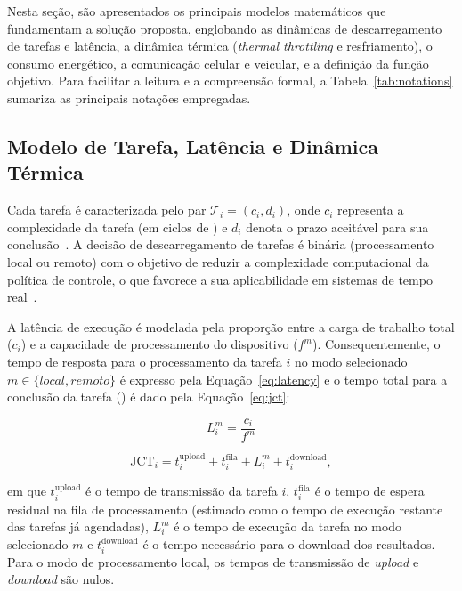 Nesta seção, são apresentados os principais modelos matemáticos que fundamentam a solução proposta, englobando as dinâmicas de descarregamento de tarefas e latência, a dinâmica térmica (\textit{thermal throttling} e resfriamento), o consumo energético, a comunicação celular e veicular, e a definição da função objetivo. Para facilitar a leitura e a compreensão formal, a Tabela~\ref{tab:notations} sumariza as principais notações empregadas.

\subsection{Modelo de Tarefa, Latência e Dinâmica Térmica}

Cada tarefa é caracterizada pelo par $\mathcal{T}_i=(c_i, d_i)$, onde $c_i$ representa a complexidade da tarefa (em ciclos de ) e $d_i$ denota o prazo aceitável para sua conclusão~\cite{liu2019, uddin2025, guo2024deep, cao2024survey}. A decisão de descarregamento de tarefas é binária (processamento local ou remoto) com o objetivo de reduzir a complexidade computacional da política de controle, o que favorece a sua aplicabilidade em sistemas de tempo real~\cite{liu2019, fofana2024}.

A latência de execução é modelada pela proporção entre a carga de trabalho total ($c_i$) e a capacidade de processamento do dispositivo ($f^m$). Consequentemente, o tempo de resposta para o processamento da tarefa $i$ no modo selecionado $m \in \{local, remoto\}$ é expresso pela Equação~\ref{eq:latency} e o tempo total para a conclusão da tarefa () é dado pela Equação~\ref{eq:jct}:

\begin{equation}
\label{eq:latency}
L_i^m = \frac{c_i}{f^m}
\end{equation}

\begin{equation}
\mathrm{JCT}_i = t_i^{\mathrm{upload}} + t_i^{\mathrm{fila}} + L_i^m + t_i^{\mathrm{download}},
\label{eq:jct}
\end{equation}

em que $t_i^{\mathrm{upload}}$ é o tempo de transmissão da tarefa $i$, $t_i^{\mathrm{fila}}$ é o tempo de espera residual na fila de processamento (estimado como o tempo de execução restante das tarefas já agendadas), $L_i^m$ é o tempo de execução da tarefa no modo selecionado $m$ e $t_i^{\mathrm{download}}$ é o tempo necessário para o download dos resultados. Para o modo de processamento local, os tempos de transmissão de \textit{upload} e \textit{download} são nulos.

